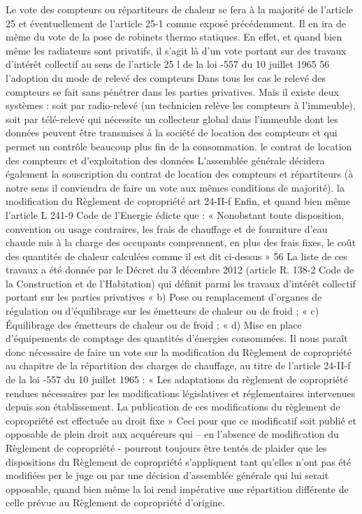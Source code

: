		Le vote des compteurs ou répartiteurs de chaleur se fera à la majorité de l’article 25 et éventuellement de l’article 25-1 comme exposé précédemment. Il en ira de même du vote de la pose de robinets thermo statiques. En effet, et quand bien même les radiateurs sont privatifs, il s’agit là d’un vote portant sur des travaux d’intérêt collectif au sens de l’article 25 l de la loi -557 du 10 juillet 1965 56
		l’adoption du mode de relevé des compteurs
		Dans tous les cas le relevé des compteurs se fait sans pénétrer dans les parties privatives. Mais il existe deux systèmes : soit par radio-relevé (un technicien relève les compteurs à l’immeuble), soit par télé-relevé qui nécessite un collecteur global dans l’immeuble dont les données peuvent être transmises à la société de location des compteurs et qui permet un contrôle beaucoup plus fin de la consommation.
		le contrat de location des compteurs et d’exploitation des données
		L’assemblée générale décidera également la souscription du contrat de location des compteurs et répartiteurs (à notre sens il conviendra de faire un vote aux mêmes conditions de majorité).
		la modification du Règlement de copropriété art 24-II-f
		Enfin, et quand bien même l’article L 241-9 Code de l’Energie édicte que :
		« Nonobstant toute disposition, convention ou usage contraires, les frais de chauffage et de fourniture d'eau chaude mis à la charge des occupants comprennent, en plus des frais fixes, le coût des quantités de chaleur calculées comme il est dit ci-dessus »
		56 La liste de ces travaux a été donnée par le Décret du 3 décembre 2012 (article R. 138-2 Code de la Construction et de l'Habitation) qui définit parmi les travaux d’intérêt collectif portant sur les parties privatives « b) Pose ou remplacement d'organes de régulation ou d'équilibrage sur les émetteurs de chaleur ou de froid ; « c) Équilibrage des émetteurs de chaleur ou de froid ; « d) Mise en place d'équipements de comptage des quantités d'énergies consommées.
		Il nous paraît donc nécessaire de faire un vote sur la modification du Règlement de copropriété au chapitre de la répartition des charges de chauffage, au titre de l’article 24-II-f de la loi -557 du 10 juillet 1965 :
		« Les adaptations du règlement de copropriété rendues nécessaires par les modifications législatives et réglementaires intervenues depuis son établissement. La publication de ces modifications du règlement de copropriété est effectuée au droit fixe »
		Ceci pour que ce modificatif soit publié et opposable de plein droit aux acquéreurs qui – en l’absence de modification du Règlement de copropriété - pourront toujours être tentés de plaider que les dispositions du Règlement de copropriété s’appliquent tant qu’elles n’ont pas été modifiées per le juge ou par une décision d’assemblée générale qui lui serait opposable, quand bien même la loi rend impérative une répartition différente de celle prévue au Règlement de copropriété d’origine.
